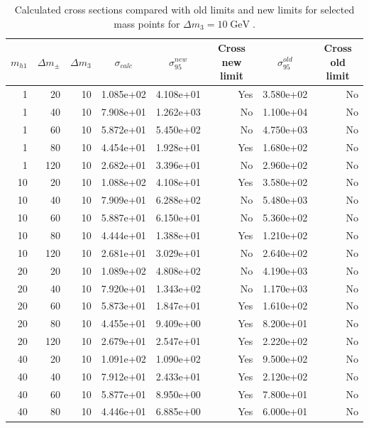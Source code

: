 \documentclass[12pt]{article}
\newcommand{\gev}{\mathrel{\text{ GeV}}}
\begin{document}
\newpage
\begin{table}[H]
    \caption{Calculated cross sections compared with old limits and new limits for selected mass points for $\Delta m_3 = 10\gev$.}
    \label{tab:cross_section_limits_10}
\begin{tabular}{rrrrrrrr}
\toprule
    \multicolumn{1}{c}{$m_{h1}$} & 
    \multicolumn{1}{c}{$\Delta m_\pm$} & 
    \multicolumn{1}{c}{$\Delta m_3$} & 
    \multicolumn{1}{c}{$\sigma_{calc}$} & 
    \multicolumn{1}{c}{$\sigma^{new}_{95}$} & 
    \multicolumn{1}{c}{Cross new limit} & 
    \multicolumn{1}{c}{$\sigma^{old}_{95}$} & 
    \multicolumn{1}{c}{Cross old limit} \\
    \midrule
1 & 20 & 10 & 1.085e+02 & 4.108e+01 & Yes & 3.580e+02 & No \\
1 & 40 & 10 & 7.908e+01 & 1.262e+03 & No & 1.100e+04 & No \\
1 & 60 & 10 & 5.872e+01 & 5.450e+02 & No & 4.750e+03 & No \\
1 & 80 & 10 & 4.454e+01 & 1.928e+01 & Yes & 1.680e+02 & No \\
1 & 120 & 10 & 2.682e+01 & 3.396e+01 & No & 2.960e+02 & No \\
10 & 20 & 10 & 1.088e+02 & 4.108e+01 & Yes & 3.580e+02 & No \\
10 & 40 & 10 & 7.909e+01 & 6.288e+02 & No & 5.480e+03 & No \\
10 & 60 & 10 & 5.887e+01 & 6.150e+01 & No & 5.360e+02 & No \\
10 & 80 & 10 & 4.444e+01 & 1.388e+01 & Yes & 1.210e+02 & No \\
10 & 120 & 10 & 2.681e+01 & 3.029e+01 & No & 2.640e+02 & No \\
20 & 20 & 10 & 1.089e+02 & 4.808e+02 & No & 4.190e+03 & No \\
20 & 40 & 10 & 7.920e+01 & 1.343e+02 & No & 1.170e+03 & No \\
20 & 60 & 10 & 5.873e+01 & 1.847e+01 & Yes & 1.610e+02 & No \\
20 & 80 & 10 & 4.455e+01 & 9.409e+00 & Yes & 8.200e+01 & No \\
20 & 120 & 10 & 2.679e+01 & 2.547e+01 & Yes & 2.220e+02 & No \\
40 & 20 & 10 & 1.091e+02 & 1.090e+02 & Yes & 9.500e+02 & No \\
40 & 40 & 10 & 7.912e+01 & 2.433e+01 & Yes & 2.120e+02 & No \\
40 & 60 & 10 & 5.877e+01 & 8.950e+00 & Yes & 7.800e+01 & No \\
40 & 80 & 10 & 4.446e+01 & 6.885e+00 & Yes & 6.000e+01 & No \\

\end{tabular}
\end{table}
\end{document}
